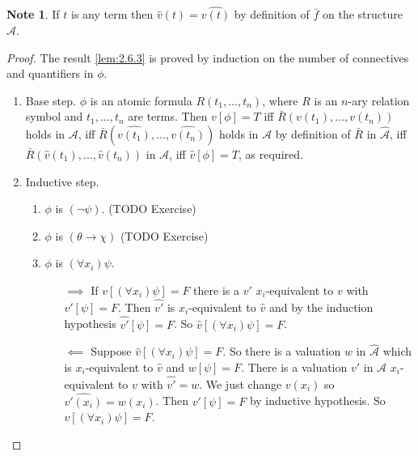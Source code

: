 \documentclass{article}
\newcommand{\rb}[1]{\left( #1 \right)}
\renewcommand{\sb}[1]{\left[ #1 \right]}
\newcommand{\notb}[1]{\rb{\neg #1}}
\newcommand{\impb}[2]{\rb{#1 \rightarrow #2}}
\newcommand{\fab}[1]{\rb{\forall #1}}
\theoremstyle{definition}\newtheorem{definition}{Definition}[subsection]
\theoremstyle{definition}\newtheorem{remark}[definition]{Remark}
\theoremstyle{definition}\newtheorem*{example}{Example}
\theoremstyle{definition}\newtheorem*{note}{Note}
\begin{document}
\begin{note}
If $ t $ is any term then $ \widehat{v}\rb{t} = \widehat{v\rb{t}} $ by definition of $ \bar{f} $ on the structure $ \widehat{\mathcal{A}} $.
\end{note}

\begin{proof}
The result \ref{lem:2.6.3} is proved by induction on the number of connectives and quantifiers in $ \phi $.
\begin{enumerate}
\item Base step. $ \phi $ is an atomic formula $ R\rb{t_1, \dots, t_n} $, where $ R $ is an $ n $-ary relation symbol and $ t_1, \dots, t_n $ are terms. Then $ v\sb{\phi} = T $ iff $ \bar{R}\rb{v\rb{t_1}, \dots, v\rb{t_n}} $ holds in $ \mathcal{A} $, iff $ \bar{R}\rb{\widehat{v\rb{t_1}}, \dots, \widehat{v\rb{t_n}}} $ holds in $ \mathcal{A} $ by definition of $ \bar{R} $ in $ \widehat{\mathcal{A}} $, iff $ \bar{R}\rb{\widehat{v}\rb{t_1}, \dots, \widehat{v}\rb{t_n}} $ in $ \mathcal{A} $, iff $ \widehat{v}\sb{\phi} = T $, as required.
\item Inductive step.
\begin{enumerate}
\item $ \phi $ is $ \notb{\psi} $. (TODO Exercise)
\item $ \phi $ is $ \impb{\theta}{\chi} $ (TODO Exercise)
\item $ \phi $ is $ \fab{x_i}\psi $.
\begin{itemize}
\item[$ \implies $] If $ v\sb{\fab{x_i}\psi} = F $ there is a $ v' $ $ x_i $-equivalent to $ v $ with $ v'\sb{\psi} = F $. Then $ \widehat{v'} $ is $ x_i $-equivalent to $ \widehat{v} $ and by the induction hypothesis $ \widehat{v'}\sb{\psi} = F $. So $ \widehat{v}\sb{\fab{x_i}\psi} = F $.
\item[$ \impliedby $] Suppose $ \widehat{v}\sb{\fab{x_i}\psi} = F $. So there is a valuation $ w $ in $ \widehat{\mathcal{A}} $ which is $ x_i $-equivalent to $ \widehat{v} $ and $ w\sb{\psi} = F $. There is a valuation $ v' $ in $ \mathcal{A} $ $ x_i $-equivalent to $ v $ with $ \widehat{v'} = w $. We just change $ v\rb{x_i} $ so $ \widehat{v'\rb{x_i}} = w\rb{x_i} $. Then $ v'\sb{\psi} = F $ by inductive hypothesis. So $ v\sb{\fab{x_i}\psi} = F $.
\end{itemize}
\end{enumerate}
\end{enumerate}
\end{proof}
\end{document}
